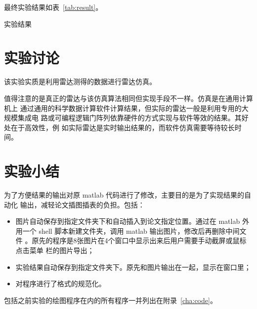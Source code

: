 \documentclass[../main]{subfiles}
\begin{document}
最终实验结果如表~\ref{tab:result}。

\begin{table}[htbp]
  \centering
  \caption{实验结果}%
  \label{tab:result}
\end{table}

\section{实验讨论}%
\label{sec:\arabic{chapter}discuss}

该实验实质是利用雷达测得的数据进行雷达仿真。

值得注意的是真正的雷达与该仿真算法相同但实现手段不一样。仿真是在通用计算机上
通过通用的科学数据计算软件计算结果，但实际的雷达一般是利用专用的大规模集成电
路或可编程逻辑门阵列依靠硬件的方式实现与软件等效的结果。其好处在于高效性，例
如实际雷达是实时输出结果的，而软件仿真需要等待较长时间。

\section{实验小结}%
\label{sec:\arabic{chapter}conclusion}

为了方便结果的输出对原 matlab 代码进行了修改，主要目的是为了实现结果的自动化
输出，减轻论文插图插表的负担。包括：

\begin{itemize}
  \item 图片自动保存到指定文件夹下和自动插入到论文指定位置。通过在 matlab
    外用一个 shell 脚本新建文件夹，调用 matlab 输出图片，修改后再删除中间文件
    。原先的程序是8张图片在4个窗口中显示出来后用户需要手动截屏或鼠标点击菜单
    栏的图片导出；
  \item 实验结果自动保存到指定文件夹下。原先和图片输出在一起，显示在窗口里；
  \item 对程序进行了格式的规范化。
\end{itemize}

包括之前实验的绘图程序在内的所有程序一并列出在附录~\ref{cha:code}。
\end{document}
